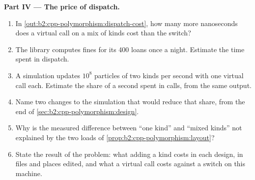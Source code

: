 \begin{problem}
\medskip\noindent\textbf{Part IV --- The price of dispatch.}\par\nopagebreak
\begin{enumerate}[resume, beginpenalty=10000]
\item In \cref{out:b2:cpp-polymorphism:dispatch-cost}, how many more nanoseconds does a virtual call on a mix of
kinds cost than the switch?
\item The library computes fines for its 400 loans once a night. Estimate the time spent in dispatch.
\item A simulation updates $10^8$ particles of two kinds per second with one virtual call each. Estimate the share
of a second spent in calls, from the same output.
\item Name two changes to the simulation that would reduce that share, from the end of
\cref{sec:b2:cpp-polymorphism:design}.
\item Why is the measured difference between ``one kind'' and ``mixed kinds'' not explained by the two loads of
\cref{prop:b2:cpp-polymorphism:layout}?
\item State the result of the problem: what adding a kind costs in each design, in files and places edited, and what
a virtual call costs against a switch on this machine.
\end{enumerate}
\end{problem}
